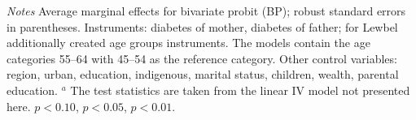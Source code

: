 \begin{table}[p]
\begin{center}
\begin{adjustbox}{max width=\textwidth, center}
\begin{threeparttable}
{\begin{tabular}{l*{4}{S S}}
\end{tabular}
\begin{tablenotes}
\item \footnotesize \textit{Notes}  Average marginal effects for bivariate probit (BP); robust standard errors in parentheses. Instruments: diabetes of mother, diabetes of father; for Lewbel additionally created age groups instruments. The models contain the age categories 55--64 with 45--54 as the reference category. Other control variables: region, urban, education, indigenous, marital status, children, wealth, parental education. $^a$ The test statistics are taken from the linear IV model not presented here.
\sym{*} \(p<0.10\), \sym{**} \(p<0.05\), \sym{***} \(p<0.01\).
\end{tablenotes}
}
\end{threeparttable} 
\end{adjustbox}
\end{center}
\end{table}

\clearpage
